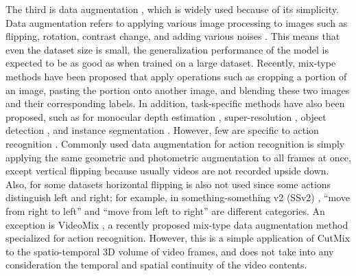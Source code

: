 The third is data augmentation
\cite{DBLP:journals/air/KhalifaLM22,DBLP:journals/jbd/ShortenK19,DBLP:journals/corr/abs-2205-01491},
which is widely used because of its simplicity.
Data augmentation refers to applying various image processing to images
such as flipping, rotation, contrast change, and adding various noises \cite{imgaug,Albumentations}.
This means that even the dataset size is small,
the generalization performance of the model is expected to be as good as when trained on a large dataset.
Recently, mix-type methods \cite{Zhang_iclr18,DBLP:journals/corr/abs-1708-04552,Yun_2019_ICCV} have been proposed
that apply operations such as cropping a portion of an image, 
pasting the portion onto another image, and blending these two images and their corresponding labels.
In addition, task-specific methods have also been proposed, 
such as for monocular depth estimation \cite{CutDepth},
super-resolution \cite{CutBlur},
object detection \cite{cutpaste},
and instance segmentation \cite{CopyPaste}.
However, few are specific to action recognition \cite{Video_Action_Understanding2021}.
Commonly used data augmentation for action recognition is simply applying the same geometric and photometric augmentation to all frames at once,
except vertical flipping because usually videos are not recorded upside down.
Also, for some datasets horizontal flipping is also not used since some actions distinguish left and right;
for example, in something-something v2 (SSv2) \cite{SSv2}, ``move from right to left'' and ``move from left to right'' are different categories.
An exception is VideoMix \cite{VideoMix}, a recently proposed mix-type data augmentation method specialized for action recognition.
However, this is a simple application of CutMix \cite{Yun_2019_ICCV} to the spatio-temporal 3D volume of video frames,
and does not take into any consideration the temporal and spatial continuity of the video contents.


